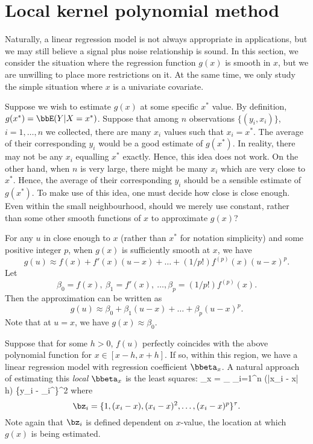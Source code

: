 \section{Local kernel polynomial method}

Naturally, a linear regression model is not always
appropriate in applications, but we may
still believe a signal plus noise relationship is sound.
In this section, we consider the situation where the
regression function $g(x)$ is smooth in $x$, but we are
unwilling to place more restrictions on it. At the same time,
we only study the simple situation where $x$ is a univariate
covariate.

Suppose we wish to estimate $g(x)$ at some specific $x^*$ value.
By definition, $g(x^*) = \bbE(Y|X=x^*)$. Suppose that
among $n$ observations
$\{(y_i, x_i)\}$, $i=1, \ldots, n$ we collected, there are many 
$x_i$ values such that $x_i = x^*$. 
The average of their corresponding
$y_i$ would be a good estimate of $g(x^*)$. In reality, there may
not be any $x_i$ equalling $x^*$ exactly. Hence, this idea does not
work. On the other hand, when $n$ is very large, there might be
many $x_i$ which are very close to $x^*$. Hence,
the average of their corresponding
$y_i$ should be a sensible estimate of $g(x^*)$.
To make use of this idea, one must decide how close is close enough.
Even within the small neighbourhood, should we merely use constant,
rather than some other smooth functions of $x$ to
approximate $g(x)$?

For any $u$ in close enough to $x$ (rather than $x^*$ for
notation simplicity) and some positive integer $p$, when $g(x)$
is sufficiently smooth at $x$, we have
\[
g(u)
\approx
f(x) + f'(x)(u-x) + \ldots + (1/p!) f^{(p)}(x)(u-x)^p.
\]
Let 
\[
\beta_0=f(x), ~\beta_1= f'(x), ~\ldots, \beta_p= (1/p!) f^{(p)}(x).
\]
Then the approximation can be written as
\[
g(u)
\approx
\beta_0 +\beta_1(u-x) + \ldots + \beta_p (u-x)^p.
\]
Note that at $u = x$, we have $g(x) \approx \beta_0$.

Suppose that for some $h>0$, $f(u)$ perfectly coincides
with the above polynomial function for $x \in [x-h, x+h]$.
If so, within this region, we have a linear regression model
with regression coefficient $\bbeta_x$.
A natural approach of estimating this {\it local}
$\bbeta_x$ is the least squares:
\bea
\hat \bbeta_x
=
\arg \min_{\bbeta}
\sum_{i=1}^{n} \ind (|x_i - x| \leq h)  \{y_i - \bz_i^\tau \bbeta \}^2
\eea
where
\[
\bz_i = \{1, (x_i - x), (x_i - x)^2, \ldots, (x_i - x)^p\}^\tau.
\]
Note again that $\bz_i$ is defined dependent on $x$-value,
the location at which $g(x)$ is being estimated.

